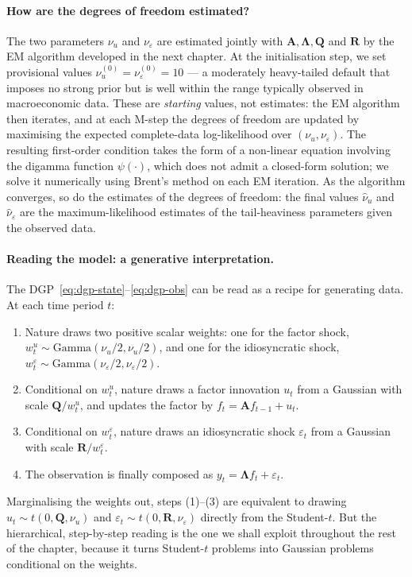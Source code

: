 \documentclass[11pt, a4paper, oneside]{article}
\newcommand{\mL}{\boldsymbol{\Lambda}}
\newcommand{\mA}{\mathbf{A}}
\newcommand{\mR}{\mathbf{R}}
\newcommand{\mQ}{\mathbf{Q}}
\begin{document}
\paragraph{How are the degrees of freedom estimated?}
The two parameters $\nu_u$ and $\nu_\varepsilon$ are estimated jointly
with $\mA, \mL, \mQ$ and $\mR$ by the EM algorithm developed in the next chapter. At the initialisation
step, we set provisional values $\nu_u^{(0)} = \nu_\varepsilon^{(0)} = 10$
— a moderately heavy-tailed default that imposes no strong prior but
is well within the range typically observed in macroeconomic data.
These are \emph{starting} values, not estimates: the EM algorithm then
iterates, and at each M-step the degrees of freedom are updated by
maximising the expected complete-data log-likelihood over
$(\nu_u, \nu_\varepsilon)$. The resulting first-order condition takes
the form of a non-linear equation involving the digamma function
$\psi(\cdot)$, which does not admit a closed-form solution; we solve
it numerically using Brent's method on each EM iteration. As the
algorithm converges, so do the estimates of the degrees of freedom:
the final values $\hat{\nu}_u$ and $\hat{\nu}_\varepsilon$ are the
maximum-likelihood estimates of the tail-heaviness parameters given
the observed data.


\paragraph{Reading the model: a generative interpretation.}
The DGP~\eqref{eq:dgp-state}–\eqref{eq:dgp-obs} can be read as a recipe
for generating data. At each time period $t$:
\begin{enumerate}[leftmargin=1.5em, itemsep=3pt]
    \item Nature draws two positive scalar weights: one for the factor
          shock, $w^u_t \sim \text{Gamma}(\nu_u/2, \nu_u/2)$, and one for
          the idiosyncratic shock,
          $w^\varepsilon_t \sim \text{Gamma}(\nu_\varepsilon/2, \nu_\varepsilon/2)$.
    \item Conditional on $w^u_t$, nature draws a factor innovation
          $u_t$ from a Gaussian with scale $\mQ/w^u_t$, and updates the
          factor by $f_t = \mA f_{t-1} + u_t$.
    \item Conditional on $w^\varepsilon_t$, nature draws an idiosyncratic
          shock $\varepsilon_t$ from a Gaussian with scale
          $\mR/w^\varepsilon_t$.
    \item The observation is finally composed as $y_t = \mL f_t + \varepsilon_t$.
\end{enumerate}
Marginalising the weights out, steps (1)–(3) are equivalent to drawing
$u_t \sim t(0, \mQ, \nu_u)$ and
$\varepsilon_t \sim t(0, \mR, \nu_\varepsilon)$ directly from the Student-$t$.
But the hierarchical, step-by-step reading is the one we shall exploit
throughout the rest of the chapter, because it turns Student-$t$ problems
into Gaussian problems conditional on the weights.
\end{document}
